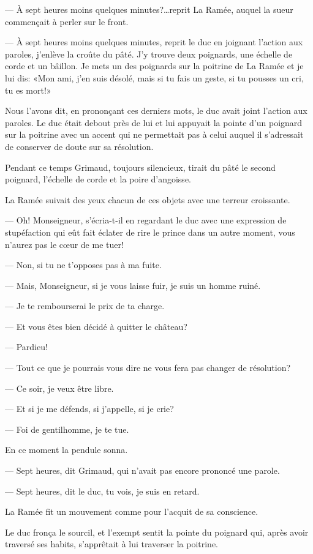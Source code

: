 — À sept heures moins quelques minutes?\dots reprit La Ramée, auquel la sueur commençait à perler sur le front.

— À sept heures moins quelques minutes, reprit le duc en joignant l'action aux paroles, j'enlève la croûte du pâté. J'y trouve deux poignards, une échelle de corde et un bâillon. Je mets un des poignards sur la poitrine de La Ramée et je lui dis: «Mon ami, j'en suis désolé, mais si tu fais un geste, si tu pousses un cri, tu es mort!»

Nous l'avons dit, en prononçant ces derniers mots, le duc avait joint l'action aux paroles. Le duc était debout près de lui et lui appuyait la pointe d'un poignard sur la poitrine avec un accent qui ne permettait pas à celui auquel il s'adressait de conserver de doute sur sa résolution.

Pendant ce temps Grimaud, toujours silencieux, tirait du pâté le second poignard, l'échelle de corde et la poire d'angoisse.

La Ramée suivait des yeux chacun de ces objets avec une terreur croissante.

— Oh! Monseigneur, s'écria-t-il en regardant le duc avec une expression de stupéfaction qui eût fait éclater de rire le prince dans un autre moment, vous n'aurez pas le cœur de me tuer!

— Non, si tu ne t'opposes pas à ma fuite.

— Mais, Monseigneur, si je vous laisse fuir, je suis un homme ruiné.

— Je te rembourserai le prix de ta charge.

— Et vous êtes bien décidé à quitter le château?

— Pardieu!

— Tout ce que je pourrais vous dire ne vous fera pas changer de résolution?

— Ce soir, je veux être libre.

— Et si je me défends, si j'appelle, si je crie?

— Foi de gentilhomme, je te tue.

En ce moment la pendule sonna.

— Sept heures, dit Grimaud, qui n'avait pas encore prononcé une parole.

— Sept heures, dit le duc, tu vois, je suis en retard.

La Ramée fit un mouvement comme pour l'acquit de sa conscience.

Le duc fronça le sourcil, et l'exempt sentit la pointe du poignard qui, après avoir traversé ses habits, s'apprêtait à lui traverser la poitrine.

